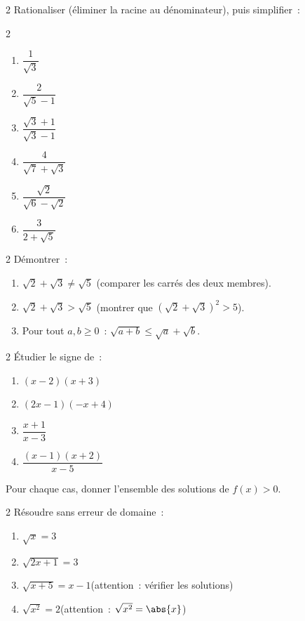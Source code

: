 \begin{exo}{2}
Rationaliser (\'eliminer la racine au d\'enominateur), puis simplifier~:
\begin{multicols}{2}
\begin{enumerate}
  \item $\dfrac{1}{\sqrt{3}}$
  \item $\dfrac{2}{\sqrt{5}-1}$
  \item $\dfrac{\sqrt{3}+1}{\sqrt{3}-1}$
  \item $\dfrac{4}{\sqrt{7}+\sqrt{3}}$
  \item $\dfrac{\sqrt{2}}{\sqrt{6}-\sqrt{2}}$
  \item $\dfrac{3}{2+\sqrt{5}}$
\end{enumerate}
\end{multicols}
\end{exo}

\begin{exo}{2}
D\'emontrer~:
\begin{enumerate}
  \item $\sqrt{2}+\sqrt{3} \ne \sqrt{5}$
        (comparer les carr\'es des deux membres).
  \item $\sqrt{2}+\sqrt{3} > \sqrt{5}$
        (montrer que $(\sqrt{2}+\sqrt{3})^2 > 5$).
  \item Pour tout $a, b \geq 0$~:
        $\sqrt{a+b} \leq \sqrt{a} + \sqrt{b}$.
\end{enumerate}
\end{exo}

\begin{exo}{2}
\'Etudier le signe de~:
\begin{enumerate}
  \item $(x-2)(x+3)$
  \item $(2x-1)(-x+4)$
  \item $\dfrac{x+1}{x-3}$
  \item $\dfrac{(x-1)(x+2)}{x-5}$
\end{enumerate}
Pour chaque cas, donner l'ensemble des solutions de $f(x) > 0$.
\end{exo}

\begin{exo}{2}
R\'esoudre sans erreur de domaine~:
\begin{enumerate}
  \item $\sqrt{x} = 3$
  \item $\sqrt{2x+1} = 3$
  \item $\sqrt{x+5} = x-1$\quad (attention~: v\'erifier les solutions)
  \item $\sqrt{x^2} = 2$\quad (attention~: $\sqrt{x^2} = \abs{x}$)
\end{enumerate}
\end{exo}

